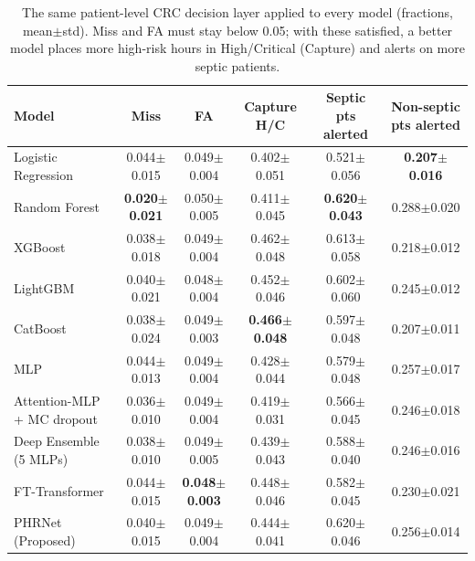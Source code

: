 \begin{table}[t]
\centering
\caption{The same patient-level CRC decision layer applied to every model (fractions, mean$\pm$std). Miss and FA must stay below 0.05; with these satisfied, a better model places more high-risk hours in High/Critical (Capture) and alerts on more septic patients.}
\label{tab:decision_all}
\footnotesize
\setlength{\tabcolsep}{3pt}
\renewcommand{\arraystretch}{1.15}
\begin{tabular}{lccccc}
\toprule
\textbf{Model} & \textbf{Miss} & \textbf{FA} & \textbf{Capture H/C} & \textbf{Septic pts alerted} & \textbf{Non-septic pts alerted} \\
\midrule
Logistic Regression & 0.044$\pm$0.015 & 0.049$\pm$0.004 & 0.402$\pm$0.051 & 0.521$\pm$0.056 & \textbf{0.207$\pm$0.016} \\
Random Forest & \textbf{0.020$\pm$0.021} & 0.050$\pm$0.005 & 0.411$\pm$0.045 & \textbf{0.620$\pm$0.043} & 0.288$\pm$0.020 \\
XGBoost & 0.038$\pm$0.018 & 0.049$\pm$0.004 & 0.462$\pm$0.048 & 0.613$\pm$0.058 & 0.218$\pm$0.012 \\
LightGBM & 0.040$\pm$0.021 & 0.048$\pm$0.004 & 0.452$\pm$0.046 & 0.602$\pm$0.060 & 0.245$\pm$0.012 \\
CatBoost & 0.038$\pm$0.024 & 0.049$\pm$0.003 & \textbf{0.466$\pm$0.048} & 0.597$\pm$0.048 & 0.207$\pm$0.011 \\
MLP & 0.044$\pm$0.013 & 0.049$\pm$0.004 & 0.428$\pm$0.044 & 0.579$\pm$0.048 & 0.257$\pm$0.017 \\
Attention-MLP + MC dropout & 0.036$\pm$0.010 & 0.049$\pm$0.004 & 0.419$\pm$0.031 & 0.566$\pm$0.045 & 0.246$\pm$0.018 \\
Deep Ensemble (5 MLPs) & 0.038$\pm$0.010 & 0.049$\pm$0.005 & 0.439$\pm$0.043 & 0.588$\pm$0.040 & 0.246$\pm$0.016 \\
FT-Transformer & 0.044$\pm$0.015 & \textbf{0.048$\pm$0.003} & 0.448$\pm$0.046 & 0.582$\pm$0.045 & 0.230$\pm$0.021 \\
PHRNet (Proposed) & 0.040$\pm$0.015 & 0.049$\pm$0.004 & 0.444$\pm$0.041 & 0.620$\pm$0.046 & 0.256$\pm$0.014 \\
\bottomrule
\end{tabular}
\end{table}